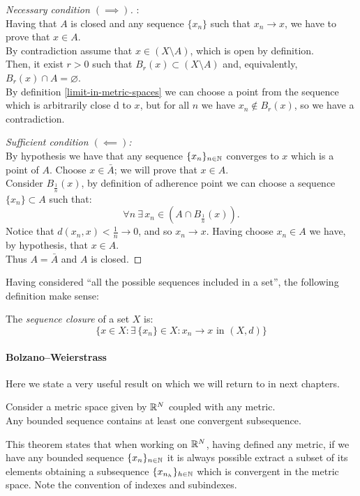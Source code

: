 \begin{proof}[Necessary condition $(\implies)$]:\\
	Having that $A$ is closed and any sequence $\{x_n\}$ such that $x_n \to x$, we have to prove that $x \in A$.\\
	By contradiction assume that $x \in \left(X\setminus A\right)$, which is open by definition.\\
	Then, it exist $r>0$ such that $B_r\left(x\right)\subset\left(X\setminus A\right)$ and, equivalently, $B_r\left(x\right)\cap A = \varnothing$. \\
	By definition \vref{limit-in-metric-spaces} we can choose a point from the sequence which is arbitrarily close d to $x$, but for all $n$ we have $x_n \notin B_r\left(x\right)$, so we have a contradiction.
	
	\textit{Sufficient condition $(\impliedby)$:}\\
	By hypothesis we have that any sequence $\{x_n\}_{n \in \mathbb N}$ converges to $x$ which is a point of $A$.	Choose $x \in \bar{A}$; we will prove that $x \in A$. \\
	Consider $B_{\frac 1 n}\left(x \right)$, by definition of adherence point we can choose a sequence $\{x_n\} \subset A$ such that:
	$$
		\forall n \ 
		\exists \, x_n 
		\in \left( A \cap B_{\frac 1 n}\left(x \right) \right)
	.
	$$
	Notice that $d\left(x_n,x\right)<\frac 1 n \to 0$, and so $x_n \to x$. Having choose $x_n \in A$ we have, by hypothesis, that $x \in A$.\\
	Thus $A = \bar{A}$ and $A$ is closed.
\end{proof}

Having considered ``all the possible sequences included in a set'', the following definition make sense:
\begin{defn}
	The \emph{sequence closure} of a set $X$ is: $$\{x \in X: \exists \, \{x_n\} \in X : x_n \to x \text{ in } (X,d)\}$$
\end{defn}

\paragraph{Bolzano--Weierstrass} Here we state a very useful result on which we will return to in next chapters.

\begin{theo} \label{bolzano-weierstrass-theo}
	Consider a metric space given by $\mathbb R^N$ coupled with any metric.\\
	Any bounded sequence contains at least one convergent subsequence.
\end{theo}

This theorem states that when working on $\mathbb R^N$, having defined any metric, if we have any bounded sequence $\{x_n\}_{n \in \mathbb N}$ it is always possible extract a subset of its elements obtaining a subsequence $\{x_{n_h}\}_{h \in \mathbb N}$ which is convergent in the metric space. Note the convention of indexes and subindexes.
